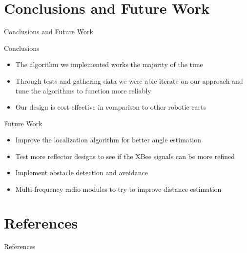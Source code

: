 \documentclass{beamer}
\begin{document}

\section{Conclusions and Future Work}

\begin{frame}{Conclusions and Future Work}
  \begin{block}{Conclusions}
    \begin{itemize}
      \item The algorithm we implemented works the majority of the time
      \item Through tests and gathering data we were able iterate on our approach and tune the algorithms to function more reliably
      \item Our design is cost effective in comparison to other robotic carts
    \end{itemize}
  \end{block}
  \begin{block}{Future Work}
    \begin{itemize}
      \item Improve the localization algorithm for better angle estimation
      \item Test more reflector designs to see if the XBee signals can be more refined
      \item Implement obstacle detection and avoidance
      \item Multi-frequency radio modules to try to improve distance estimation
    \end{itemize}
  \end{block}
\end{frame}


\section{References}

\begin{frame}{References}
  
  
\end{frame}

\end{document}
